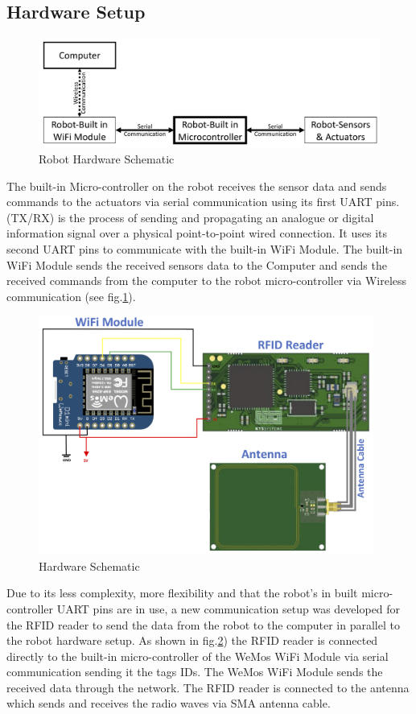 \subsection{Hardware Setup}
\begin{figure}[!htb]
	\centering
	\includegraphics[width = 13cm]{Pictures/roboschematic}
	\caption{Robot Hardware Schematic}
	\label{robo_schematic}
\end{figure}
The built-in Micro-controller on the robot receives the sensor data and sends commands to the actuators via serial communication using its first UART pins. (TX/RX) is the process of sending and propagating an analogue or digital information signal over a physical point-to-point wired connection. It uses its second UART pins to communicate with the built-in WiFi Module. The built-in WiFi Module sends the received sensors data to the Computer and sends the received commands from the computer to the robot micro-controller via Wireless communication (see fig.\ref{robo_schematic}).
\begin{figure}[!htb]
	\centering
	\includegraphics[width = 11cm]{Pictures/hwschematic}
	\caption{Hardware Schematic}
	\label{hw_schematic}
\end{figure}
Due to its less complexity, more flexibility and that the robot's in built micro-controller UART pins are in use, a new communication setup was developed for the RFID reader to send the data from the robot to the computer in parallel to the robot hardware setup. As shown in fig.\ref{hw_schematic}) the RFID reader is connected directly to the built-in micro-controller of the WeMos WiFi Module via serial communication sending it the tags IDs. The WeMos WiFi Module sends the received data through the network. The RFID reader is connected to the antenna which sends and receives the radio waves via SMA antenna cable.\\
